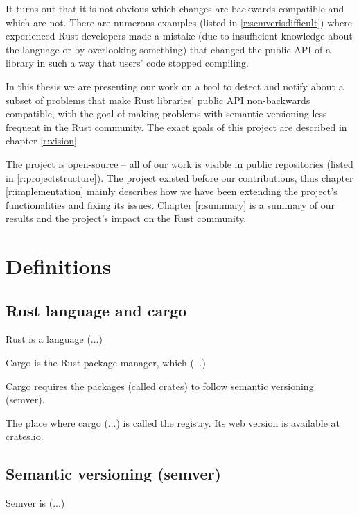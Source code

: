 \documentclass[licencjacka,en]{pracamgr}
\begin{document}
It turns out that it is not obvious which changes are backwards-compatible
and which are not. There are numerous examples (listed in \ref{r:semverisdifficult})
where experienced Rust developers made a mistake 
(due to insufficient knowledge about the language or by overlooking something)
that changed the public API of a library in such a way that users' code stopped compiling.

In this thesis we are presenting our work on a tool to detect and notify about
a subset of problems that make Rust libraries' public API non-backwards compatible,
with the goal of making problems with semantic versioning less frequent in the Rust community.
The exact goals of this project are described in chapter \ref{r:vision}.

The project is open-source -- all of our work is visible in public repositories
(listed in \ref{r:projectstructure}). The project existed before our contributions,
thus chapter \ref{r:implementation} mainly describes how we have 
been extending the project's functionalities and fixing its issues.
Chapter \ref{r:summary} is a summary of our results and the project's impact 
on the Rust community.




\chapter{Definitions}\label{r:definitions}

\section{Rust language and cargo}

Rust is a language (...)

Cargo is the Rust package manager, which (...)

Cargo requires the packages (called crates) to follow semantic versioning (semver).

The place where cargo (...) is called the registry.
Its web version is available at crates.io.


\section{Semantic versioning (semver)}

Semver is (...)
\end{document}
